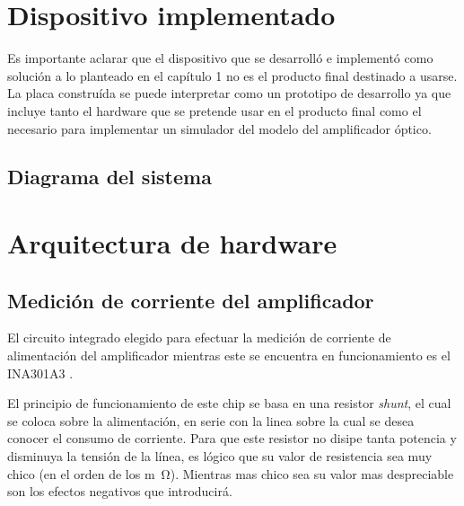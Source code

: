 


\section{Dispositivo implementado}

Es importante aclarar que el dispositivo que se desarrolló e implementó como solución a lo planteado en el capítulo 1 no es el producto final destinado a usarse. La placa construída se puede interpretar como un prototipo de desarrollo ya que incluye tanto el hardware que se pretende usar en el producto final como el necesario para implementar un simulador del modelo del amplificador óptico.

\subsection{Diagrama del sistema}


\section{Arquitectura de hardware}

\subsection{Medición de corriente del amplificador}

El circuito integrado elegido para efectuar la medición de corriente de alimentación del amplificador mientras este se encuentra en funcionamiento es el INA301A3 \citep{INA301}.

El principio de funcionamiento de este chip se basa en una resistor \textit{shunt}, el cual se coloca sobre la alimentación, en serie con la linea sobre la cual se desea conocer el consumo de corriente. Para que este resistor no disipe tanta potencia y disminuya la tensión de la línea, es lógico que su valor de resistencia sea muy chico (en el orden de los \si{m\ohm}). Mientras mas chico sea su valor mas despreciable son los efectos negativos que introducirá.

